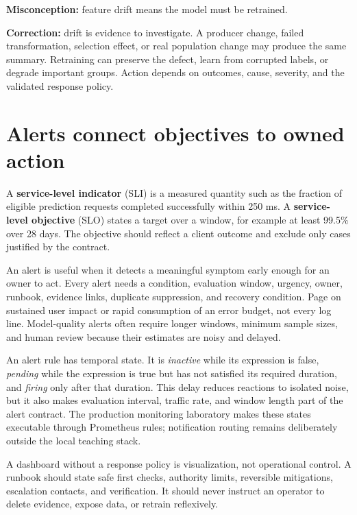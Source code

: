 \begin{misconceptionbox}
\textbf{Misconception:} feature drift means the model must be retrained.

\textbf{Correction:} drift is evidence to investigate. A producer change,
failed transformation, selection effect, or real population change may produce
the same summary. Retraining can preserve the defect, learn from corrupted
labels, or degrade important groups. Action depends on outcomes, cause,
severity, and the validated response policy.
\end{misconceptionbox}

\section{Alerts connect objectives to owned action}

A \textbf{service-level indicator} (SLI) is a measured quantity such as the
fraction of eligible prediction requests completed successfully within 250 ms.
A \textbf{service-level objective} (SLO) states a target over a window, for
example at least 99.5\% over 28 days. The objective should reflect a client
outcome and exclude only cases justified by the contract.

An alert is useful when it detects a meaningful symptom early enough for an
owner to act. Every alert needs a condition, evaluation window, urgency, owner,
runbook, evidence links, duplicate suppression, and recovery condition. Page on
sustained user impact or rapid consumption of an error budget, not every log
line. Model-quality alerts often require longer windows, minimum sample sizes,
and human review because their estimates are noisy and delayed.

An alert rule has temporal state. It is \emph{inactive} while its expression is
false, \emph{pending} while the expression is true but has not satisfied its
required duration, and \emph{firing} only after that duration. This delay
reduces reactions to isolated noise, but it also makes evaluation interval,
traffic rate, and window length part of the alert contract. The production
monitoring laboratory makes these states executable through Prometheus rules;
notification routing remains deliberately outside the local teaching stack.

A dashboard without a response policy is visualization, not operational
control. A runbook should state safe first checks, authority limits, reversible
mitigations, escalation contacts, and verification. It should never instruct an
operator to delete evidence, expose data, or retrain reflexively.

